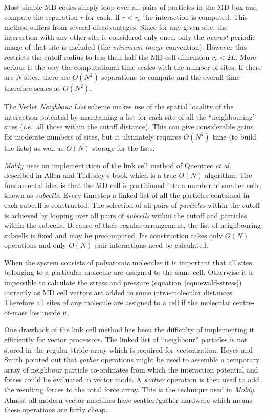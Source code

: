 \documentclass[a4paper,twoside]{report}
\newcommand{\moldy}{\emph{Moldy}}
\newcommand{\ie}{\emph{i.e.}}
\begin{document}
Most simple MD codes simply loop over all pairs of particles in the MD
box and compute the separation $r$ for each.  If $r < r_c$ the
interaction is computed.  This method suffers from several
disadvantages.  Since for any given site, the interaction with any
other site is considered only once, only the \emph{nearest} periodic
image of that site is included (the \emph{minimum-image} convention).
However this restricts the cutoff radius to less than half the MD cell
dimension $r_c < 2L$.  More serious is the way the computational
time scales with the number of sites.  If there are $N$ sites, there
are $O(N^2)$ separations to compute and the overall time therefore scales
as $O(N^2)$.

The Verlet \emph{Neighbour List} scheme\cite[pp 146-149]{allen:87} makes
use of the spatial locality of the interaction potential by
maintaining a list for each site of all the ``neighbouring'' sites
(\ie\ all those within the cutoff distance).  This can give
considerable gains for moderate numbers of sites, but it ultimately
requires $O(N^2)$ time (to build the lists) as well as $O(N)$ storage for
the lists.

\moldy\ uses an implementation of the link cell method of Quentrec
\emph{et al}.\cite{quentrec:75} described in Allen and Tildesley's
book\cite[pp 149-152]{allen:87} which is a true $O(N)$ algorithm.  The
fundamental idea is that the MD cell is partitioned into a number of
smaller cells, known as \emph{subcells}.  Every timestep a linked list
of all the particles contained in each subcell is constructed.  The
selection of all pairs of \emph{particles} within the cutoff is
achieved by looping over all pairs of \emph{subcells} within the
cutoff and particles within the subcells.  Because of their regular
arrangement, the list of neighbouring subcells is fixed and may be
precomputed.  Its construction takes only $O(N)$ operations and only
$O(N)$ pair interactions need be calculated.


When the system consists of polyatomic molecules it is important that
all sites belonging to a particular molecule are assigned to the same
cell.  Otherwise it is impossible to calculate the stress and pressure
(equation~\ref{eqn:ewald-stress}) correctly as MD cell vectors are
added to some intra-molecular distances.  Therefore all sites of any
molecule are assigned to a cell if the molecular centre-of-mass lies
inside it.

One drawback of the link cell method has been the difficulty of
implementing it efficiently for vector processors.  The linked list of
``neighbour'' particles is not stored in the regular-stride array
which is required for vectorization.  Heyes and Smith\cite{heyes:87}
pointed out that \emph{gather} operations might be used to assemble a
temporary array of neighbour particle co-ordinates from which the
interaction potential and forces could be evaluated in vector mode.  A
\emph{scatter} operation is then used to add the resulting forces to
the total force array.  This is the technique used in \moldy.  Almost
all modern vector machines have scatter/gather hardware which means
these operations are fairly cheap.
\end{document}
